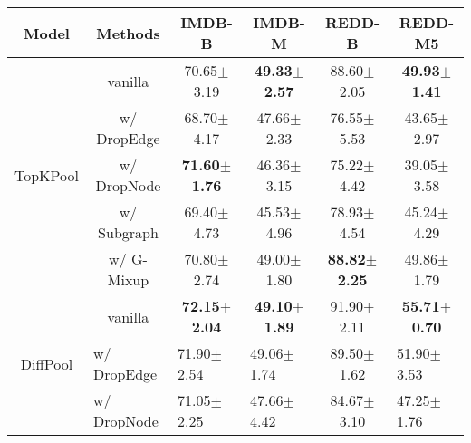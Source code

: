 \begin{table}[H]
\centering
\footnotesize
\begin{tabular}{clllcl}
\hline
Model                       & \multicolumn{1}{c}{Methods}     & \multicolumn{1}{c}{IMDB-B}                  & \multicolumn{1}{c}{IMDB-M}                  & REDD-B                                      & \multicolumn{1}{c}{REDD-M5}                 \\ \hline
\multirow{5}{*}{TopKPool}   & \multicolumn{1}{c}{vanilla}     & \multicolumn{1}{c}{70.65$\pm$3.19}          & \multicolumn{1}{c}{\textbf{49.33$\pm$2.57}} & 88.60$\pm$2.05                              & \multicolumn{1}{c}{\textbf{49.93$\pm$1.41}} \\
                            & \multicolumn{1}{c}{w/ DropEdge} & \multicolumn{1}{c}{68.70$\pm$4.17}          & \multicolumn{1}{c}{47.66$\pm$2.33}          & 76.55$\pm$5.53                              & \multicolumn{1}{c}{43.65$\pm$2.97}          \\
                            & \multicolumn{1}{c}{w/ DropNode} & \multicolumn{1}{c}{\textbf{71.60$\pm$1.76}} & \multicolumn{1}{c}{46.36$\pm$3.15}          & 75.22$\pm$4.42                              & \multicolumn{1}{c}{39.05$\pm$3.58}          \\
                            & \multicolumn{1}{c}{w/ Subgraph} & \multicolumn{1}{c}{69.40$\pm$4.73}          & \multicolumn{1}{c}{45.53$\pm$4.96}          & 78.93$\pm$4.54                              & \multicolumn{1}{c}{45.24$\pm$4.29}          \\
                            & \multicolumn{1}{c}{w/ G-Mixup}  & \multicolumn{1}{c}{70.80$\pm$2.74}          & \multicolumn{1}{c}{49.00$\pm$1.80}          & \textbf{88.82$\pm$2.25}                     & \multicolumn{1}{c}{49.86$\pm$1.79}          \\ \hline
\multirow{5}{*}{DiffPool}   & \multicolumn{1}{c}{vanilla}     & \multicolumn{1}{c}{\textbf{72.15$\pm$2.04}} & \multicolumn{1}{c}{\textbf{49.10$\pm$1.89}} & 91.90$\pm$2.11                              & \multicolumn{1}{c}{\textbf{55.71$\pm$0.70}} \\
                            & w/ DropEdge                     & 71.90$\pm$2.54                              & 49.06$\pm$1.74                              & 89.50$\pm$1.62                              & 51.90$\pm$3.53                              \\
                            & w/ DropNode                     & 71.05$\pm$2.25                              & 47.66$\pm$4.42                              & 84.67$\pm$3.10                              & 47.25$\pm$1.76                              \\

\end{tabular}
\end{table}
